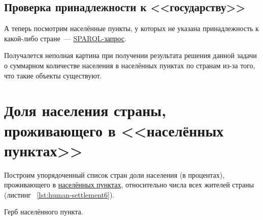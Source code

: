 \subsection{Проверка принадлежности к <<государству>>}

А теперь посмотрим населённые пункты, у которых не указана принадлежность к какой-либо стране~--- \href{https://w.wiki/4FV8}{SPARQL-запрос}\footnotemark.

Получалется неполная картина при получении результата решения данной задачи о суммарном количестве населения в населённых пунктах по странам из-за того, что такие объекты существуют.

\section{Доля населения страны, проживающего в <<населённых пунктах>>}

Построим упорядоченный список стран доли населения (в процентах), проживающего в \href{http://www.wikidata.org/entity/Q486972}{населённых пунктах}, относительно числа всех жителей страны (листинг ~\protect\ref{lst:human-settlement6}).

\begin{marginfigure}[0.0cm]
{
\setlength{\fboxsep}{0pt}%
\setlength{\fboxrule}{1pt}%
%
}
  \caption{Герб населённого пункта.}%
  \label{fig:flag_question_human_settlements3}%
\end{marginfigure}


